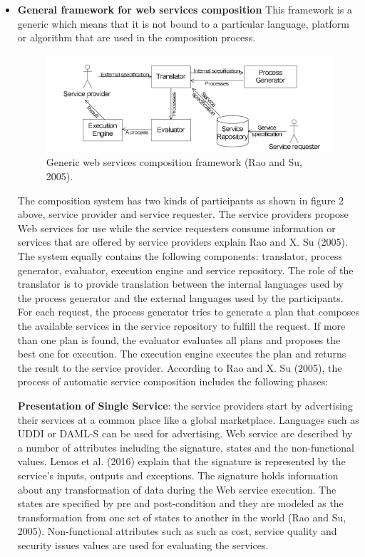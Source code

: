 \documentclass{article}
\begin{document}
\begin{itemize} 
\item \textbf{General framework for web services composition}
This framework is a generic which means that it is not bound to a particular language, platform or algorithm that are used in the composition process. 

\begin{figure}[h!]
\includegraphics{generic_ws_composition.png}
\caption{Generic web services composition framework (Rao and Su, 2005).}
\end{figure}

The composition system has two kinds of participants as shown in figure 2 above, service provider and service requester. The service providers propose Web services for use while the service requesters consume information or services that are offered by service providers explain Rao and X. Su (2005). The system equally contains the following components: translator, process generator, evaluator, execution engine and service repository. The role of the translator is to provide translation between the internal languages used by the process generator and the external languages used by the participants. For each request, the process generator tries to generate a plan that composes the available services in the service repository to fulfill the request. If more than one plan is found, the evaluator evaluates all plans and proposes the best one for execution. The execution engine executes the plan and returns the result to the service provider. According to Rao and X. Su (2005), the process of automatic service composition includes the following phases:

\textbf{Presentation of Single Service}: the service providers start by advertising their services at a common place like a global marketplace. Languages such as UDDI or DAML-S can be used for advertising. Web service are described by a number of attributes including the signature, states and the non-functional values. Lemos et al. (2016) explain that the signature is represented by the service’s inputs, outputs and exceptions. The signature holds information about any transformation of data during the Web service execution. The states are specified by pre and post-condition and they are modeled as the transformation from one set of states to another in the world (Rao and Su, 2005). Non-functional attributes such as such as cost, service quality and security issues values are used for evaluating the services.


\end{itemize}
\end{document}
